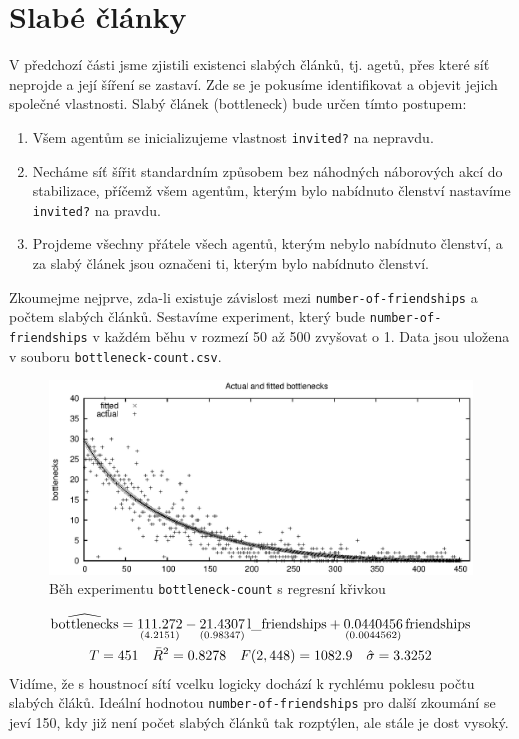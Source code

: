 \documentclass[a4wide,12pt]{report}
\begin{document}
\section{Slabé články}
V předchozí části jsme zjistili existenci slabých článků, tj. agetů, přes které síť neprojde a její šíření se zastaví. Zde se je pokusíme identifikovat a objevit jejich společné vlastnosti. Slabý článek (bottleneck) bude určen tímto postupem:
\begin{enumerate}
\item Všem agentům se inicializujeme vlastnost \texttt{invited?} na nepravdu.
\item Necháme síť šířit standardním způsobem bez náhodných náborových akcí do stabilizace, příčemž všem agentům, kterým bylo nabídnuto členství nastavíme \texttt{invited?} na pravdu.
\item Projdeme všechny přátele všech agentů, kterým nebylo nabídnuto členství, a za slabý článek jsou označeni ti, kterým bylo nabídnuto členství.
\end{enumerate}
Zkoumejme nejprve, zda-li existuje závislost mezi \texttt{number-of-friendships} a počtem slabých článků. Sestavíme experiment, který bude \texttt{number-of-friendships} v každém běhu v rozmezí 50 až 500 zvyšovat o 1. Data jsou uložena v souboru \texttt{bottleneck-count.csv}.
\begin{figure}[h]
  \centering
  \includegraphics{bottleneck-count.eps}
  \caption{Běh experimentu \texttt{bottleneck-count} s regresní křivkou}
  \label{fig:bottleneck-count}
\end{figure}
\begin{gather}
\widehat{\rm bottlenecks} = 
\underset{(4.2151)}{111.272}
-\underset{(0.98347)}{21.4307}\,\mbox{l\_friendships}
+\underset{(0.0044562)}{0.0440456}\,\mbox{friendships}
 \notag \\
T = 451 \quad \bar{R}^2 = 0.8278 \quad F(2,448) = 1082.9 \quad \hat{\sigma} = 3.3252 \notag
\end{gather}
Vidíme, že s houstnocí sítí vcelku logicky dochází k rychlému poklesu počtu slabých čláků. Ideální hodnotou \texttt{number-of-friendships} pro další zkoumání se jeví 150, kdy již není počet slabých článků tak rozptýlen, ale stále je dost vysoký.
\end{document}
